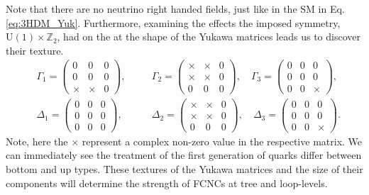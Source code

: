 Note that there are no neutrino right handed fields, just like in the SM in Eq. \ref{eq:3HDM_Yuk}. 
%
Furthermore, examining the effects the imposed symmetry, $\mathrm{U}(1)\times\mathbb{Z}_2$, had on the at the shape of the Yukawa matrices leads us to discover their texture.  
%
\begin{equation}
\begin{aligned}
&\Gamma_1  = \begin{pmatrix}
0 & 0 & 0\\
0 & 0 & 0\\
\times & \times & 0
\end{pmatrix}, \quad 
&&\Gamma_2  = \begin{pmatrix}
\times & \times & 0\\
\times & \times & 0\\
0 & 0 & 0
\end{pmatrix}, \quad
\Gamma_3  = \begin{pmatrix}
0 & 0 & 0\\
0 & 0 & 0\\
0 & 0 & \times
\end{pmatrix}, \\[1em]
&\Delta_1  = \begin{pmatrix}
0 & 0 & 0\\
0 & 0 & 0\\
0 & 0 & 0
\end{pmatrix}, \quad 
&&\Delta_2 = \begin{pmatrix}
\times & \times & 0\\
\times & \times & 0\\
0 & 0 & 0
\end{pmatrix} , \quad 
\Delta_3 = \begin{pmatrix}
0 & 0 & 0\\
0 & 0 & 0\\
0 & 0 & \times
\end{pmatrix}. 
\end{aligned} 
\end{equation}
%
Note, here the $\times$ represent a complex non-zero value in the respective matrix. 
%
We can immediately see the treatment of the first generation of quarks differ between bottom and up types. 
%
%
These textures of the Yukawa matrices and the size of their components will determine the strength of FCNCs at tree and loop-levels. 
%

